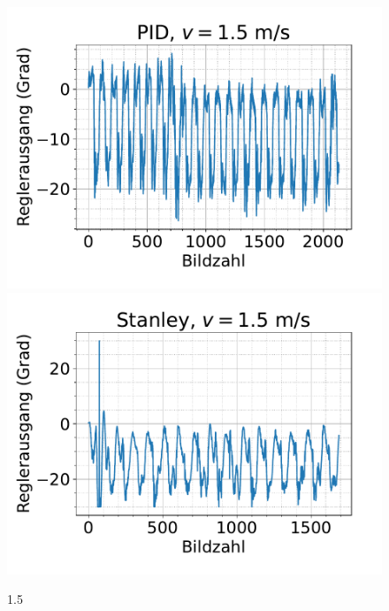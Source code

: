 \documentclass[arbeit=studie,oneside,BCOR=12mm]{ArbeitRST}
\begin{document}
\begin{figure}[h]
    \centering
    \includegraphics[scale=0.47]{pid1.5}
    \includegraphics[scale=0.47]{Stan1.5}
    \caption{1.5}
    \label{reg:1.5}
\end{figure}
\end{document}
